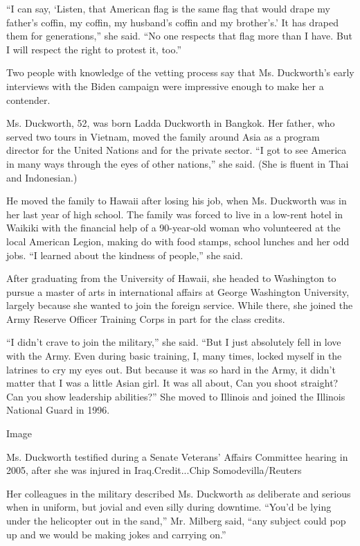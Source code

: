 ``I can say, `Listen, that American flag is the same flag that would
drape my father's coffin, my coffin, my husband's coffin and my
brother's.' It has draped them for generations,'' she said. ``No one
respects that flag more than I have. But I will respect the right to
protest it, too.''

Two people with knowledge of the vetting process say that Ms.
Duckworth's early interviews with the Biden campaign were impressive
enough to make her a contender.

Ms. Duckworth, 52, was born Ladda Duckworth in Bangkok. Her father, who
served two tours in Vietnam, moved the family around Asia as a program
director for the United Nations and for the private sector. ``I got to
see America in many ways through the eyes of other nations,'' she said.
(She is fluent in Thai and Indonesian.)

He moved the family to Hawaii after losing his job, when Ms. Duckworth
was in her last year of high school. The family was forced to live in a
low-rent hotel in Waikiki with the financial help of a 90-year-old woman
who volunteered at the local American Legion, making do with food
stamps, school lunches and her odd jobs. ``I learned about the kindness
of people,'' she said.

After graduating from the University of Hawaii, she headed to Washington
to pursue a master of arts in international affairs at George Washington
University, largely because she wanted to join the foreign service.
While there, she joined the Army Reserve Officer Training Corps in part
for the class credits.

``I didn't crave to join the military,'' she said. ``But I just
absolutely fell in love with the Army. Even during basic training, I,
many times, locked myself in the latrines to cry my eyes out. But
because it was so hard in the Army, it didn't matter that I was a little
Asian girl. It was all about, Can you shoot straight? Can you show
leadership abilities?'' She moved to Illinois and joined the Illinois
National Guard in 1996.

Image

Ms. Duckworth testified during a Senate Veterans' Affairs Committee
hearing in 2005, after she was injured in Iraq.Credit...Chip
Somodevilla/Reuters

Her colleagues in the military described Ms. Duckworth as deliberate and
serious when in uniform, but jovial and even silly during downtime.
``You'd be lying under the helicopter out in the sand,'' Mr. Milberg
said, ``any subject could pop up and we would be making jokes and
carrying on.''

